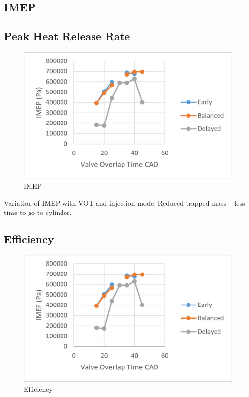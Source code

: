 \documentclass[conference]{IEEEtran}
\begin{document}
\subsection{IMEP}

\subsection{Peak Heat Release Rate}
\begin{figure}[htbp]
    \centerline{\includegraphics{Plots/imep.png}}
    \caption{IMEP}
    \label{plt_5}
    \end{figure}
Variation of IMEP with VOT and injection mode.
Reduced trapped mass – less time to go to cylinder.
    
\subsection{Efficiency}
\begin{figure}[htbp]
    \centerline{\includegraphics{Plots/imep.png}}
    \caption{Efficiency}
    \label{plt_6}
    \end{figure}
\end{document}
